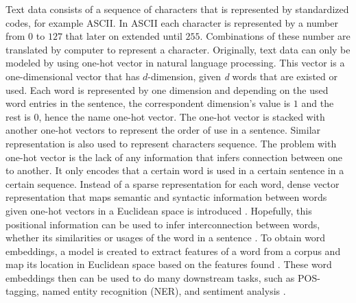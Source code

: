     Text data consists of a sequence of characters that is represented
    by standardized codes, for example ASCII. In ASCII each character
    is represented by a number from $0$ to $127$ that later on
    extended until $255$. Combinations of these number are translated
    by computer to represent a character. Originally, text data can
    only be modeled by using one-hot vector in natural language
    processing. This vector is a one-dimensional vector that has
    $d$-dimension, given \textit{d} words that are existed or used.
    Each word is represented by one dimension and depending on the
    used word entries in the sentence, the correspondent dimension's
    value is $1$ and the rest is $0$, hence the name one-hot vector.
    The one-hot vector is stacked with another one-hot vectors to
    represent the order of use in a sentence. Similar representation
    is also used to represent characters sequence. The problem with
    one-hot vector is the lack of any information that infers
    connection between one to another. It only encodes that a certain
    word is used in a certain sentence in a certain sequence. Instead
    of a sparse representation for each word, dense vector
    representation that maps semantic and syntactic information
    between words given one-hot vectors in a Euclidean space is
    introduced \citep{wordembedding2017yang, Distributed2013mikolov}.
    Hopefully, this positional information can be used to infer
    interconnection between words, whether its similarities or usages
    of the word in a sentence \citep{distributional1954harris}. To
    obtain word embeddings, a model is created to extract features of
    a word from a corpus and map its location in Euclidean space based
    on the features found \citep{Distributed2013mikolov,
    polyglot2013alrfou, dict2vect2017tissier}. These word embeddings
    then can be used to do many downstream tasks, such as POS-tagging,
    named entity recognition (NER), and sentiment analysis
    \citep{finding2015ling, neural2016lample}.

